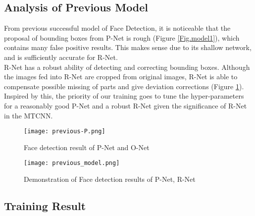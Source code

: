 \subsection{Analysis of Previous Model}
From previous successful model of Face Detection, it is noticeable that the proposal of bounding boxes from P-Net is rough (Figure \ref{Fig.model1}), which contains many false positive results. This makes sense due to its shallow network, and is sufficiently accurate for R-Net. \\[.2in]
R-Net has a robust ability of detecting and correcting bounding boxes. Although the images fed into R-Net are cropped from original images, R-Net is able to compensate possible missing of parts and give deviation corrections (Figure \ref{Fig.model2}). \\[.2in]
Inspired by this, the priority of our training goes to tune the hyper-parameters for a reasonably good P-Net and a robust R-Net given the significance of R-Net in the MTCNN.
\begin{figure}
\centering
\texttt{[image: previous-P.png]}
\caption{Face detection result of P-Net and O-Net} 
\label{Fig.model1}
\vspace{.4in}
\texttt{[image: previous\_model.png]}
\caption{Demonstration of Face detection results of P-Net, R-Net} 
\label{Fig.model2}
\end{figure}
\subsection{Training Result}
